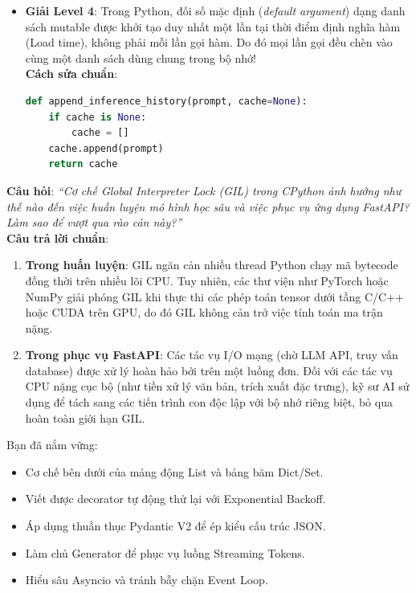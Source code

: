 \begin{solutionbox}
\begin{itemize}
  \item \textbf{Giải Level 4}: Trong Python, đối số mặc định (\textit{default argument}) dạng danh sách mutable  được khởi tạo duy nhất một lần tại thời điểm định nghĩa hàm (Load time), không phải mỗi lần gọi hàm. Do đó mọi lần gọi đều chèn vào cùng một danh sách dùng chung trong bộ nhớ!\\
  \textbf{Cách sửa chuẩn}:
\begin{lstlisting}[language=Python]
def append_inference_history(prompt, cache=None):
    if cache is None:
        cache = []
    cache.append(prompt)
    return cache
\end{lstlisting}
\end{itemize}
\end{solutionbox}

\begin{interviewbox}
\textbf{Câu hỏi}: \textit{``Cơ chế Global Interpreter Lock (GIL) trong CPython ảnh hưởng như thế nào đến việc huấn luyện mô hình học sâu và việc phục vụ ứng dụng FastAPI? Làm sao để vượt qua rào cản này?''}\\
\textbf{Câu trả lời chuẩn}:
\begin{enumerate}
  \item \textbf{Trong huấn luyện}: GIL ngăn cản nhiều thread Python chạy mã bytecode đồng thời trên nhiều lõi CPU. Tuy nhiên, các thư viện như PyTorch hoặc NumPy giải phóng GIL khi thực thi các phép toán tensor dưới tầng C/C++ hoặc CUDA trên GPU, do đó GIL không cản trở việc tính toán ma trận nặng.
  \item \textbf{Trong phục vụ FastAPI}: Các tác vụ I/O mạng (chờ LLM API, truy vấn database) được xử lý hoàn hảo bởi  trên một luồng đơn. Đối với các tác vụ CPU nặng cục bộ (như tiền xử lý văn bản, trích xuất đặc trưng), kỹ sư AI sử dụng  để tách sang các tiến trình con độc lập với bộ nhớ riêng biệt, bỏ qua hoàn toàn giới hạn GIL.
\end{enumerate}
\end{interviewbox}

\begin{checkpointbox}
Bạn đã nắm vững:
\begin{itemize}
  \item[$\square$] Cơ chế bên dưới của mảng động List và bảng băm Dict/Set.
  \item[$\square$] Viết được decorator tự động thử lại với Exponential Backoff.
  \item[$\square$] Áp dụng thuần thục Pydantic V2 để ép kiểu cấu trúc JSON.
  \item[$\square$] Làm chủ Generator để phục vụ luồng Streaming Tokens.
  \item[$\square$] Hiểu sâu Asyncio và tránh bẫy chặn Event Loop.
\end{itemize}
\end{checkpointbox}

